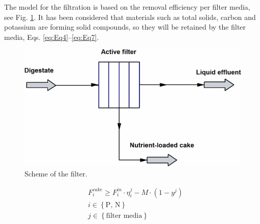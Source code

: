\begin{refsection}[referencesCh2]
The model for the filtration is based on the removal efficiency per filter media, see Fig. \ref{fig:FilterScheme}. It has been considered that materials such as total solids, carbon and potassium are forming solid compounds, so they will be retained by the filter media, Eqs. \ref{eq:Eq4}–\ref{eq:Eq7}.
\begin{figure}[h]
	\centering
	\includegraphics[width=0.6\linewidth, trim={0cm 0cm 0cm 0cm},clip]{gfx/Chapter2/Fig2.pdf} 
	\caption{Scheme of the filter.}
	\label{fig:FilterScheme}
\end{figure}

\begin{equation}
	\begin{aligned}
		& F_i^{{cake}} \ge F_i^{{in}} \cdot \eta _i^{j} - M\cdot \left(1 - {y^j}\right) \\
		& {i} \in \left\{ \text{P, N} \right\} \\
		& j \in \left\{ {{\text{filter media}}} \right\} \label{eq:Eq2}
	\end{aligned}
\end{equation}


\end{refsection}
